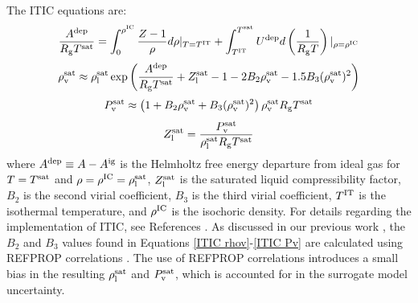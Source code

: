 \documentclass[preprint,letterpaper,floatfix,citeautoscript,aip,jcp]{revtex4-1}
\begin{document}
The 
ITIC equations are: 
\begin{equation} \label{ITIC A}
\frac{A^{\rm dep}}{R_{\rm g}T^{\rm sat}} = \int_{0}^{\rho^{\rm IC}}\frac{Z-1}{\rho} d \rho |_{T = T^{\rm IT}} + \int_{T^{\rm IT}}^{T^{\rm sat}}U^{\rm dep}d\left(\frac{1}{R_{\rm g}T}\right)|_{\rho=\rho^{\rm IC}}
\end{equation}
\begin{equation} \label{ITIC rhov}
\rho_{\rm v}^{\rm sat} \approx \rho_{\rm l}^{\rm sat} \exp \left( \frac{A^{\rm dep}}{R_{\rm g}T^{\rm sat}} + Z_{\rm l}^{\rm sat} - 1 - 2 B_2 \rho_{\rm v}^{\rm sat} - 1.5 B_3 (\rho_{\rm v}^{\rm sat})^2 \right)
\end{equation}
\begin{equation} \label{ITIC Pv}
P_{\rm v}^{\rm sat} \approx \left(1 + B_2 \rho_{\rm v}^{\rm sat} + B_3 (\rho_{\rm v}^{\rm sat})^2\right)\rho_{\rm v}^{\rm sat} R_{\rm g}T^{\rm sat}
\end{equation}
\begin{equation} \label{ITIC Zl}
Z_{\rm l}^{\rm sat} = \frac{P_{\rm v}^{\rm sat}}{\rho_{\rm l}^{\rm sat} R_{\rm g} T^{\rm sat}}
\end{equation}
where $A^{\rm dep} \equiv A-A^{\rm ig}$ is the Helmholtz free energy departure from ideal gas for $T = T^{\rm sat}$ and $\rho = \rho^{\rm IC} = \rho_{\rm l}^{\rm sat}$, $Z_{\rm l}^{\rm sat}$ is the saturated liquid compressibility factor, $B_2$ is the second virial coefficient, $B_3$ is the third virial coefficient, $T^{\rm IT}$ is the isothermal temperature, and $\rho^{\rm IC}$ is the isochoric density. For details regarding the implementation of ITIC, see References . As discussed in our previous work \cite{Postdoc_1}, the $B_2$ and $B_3$ values found in Equations \ref{ITIC rhov}-\ref{ITIC Pv} are calculated using REFPROP correlations \cite{LEMMON-RP91}. The use of REFPROP correlations introduces a small bias in the resulting $\rho_{\rm l}^{\rm sat}$ and $P_{\rm v}^{\rm sat}$, which is accounted for in the surrogate model uncertainty.
\end{document}
